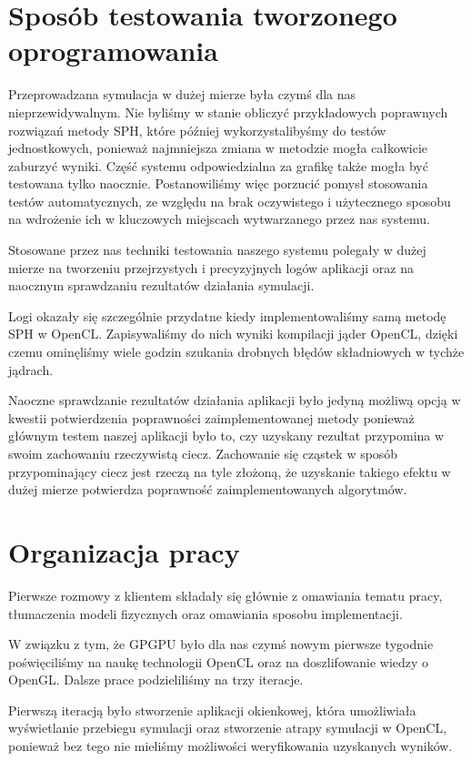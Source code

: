 \documentclass[polish, 12pt]{aghthesis}
\begin{document}
\section{Sposób testowania tworzonego oprogramowania}

	Przeprowadzana symulacja w dużej mierze była czymś dla nas nieprzewidywalnym. Nie byliśmy w stanie obliczyć przykładowych poprawnych rozwiązań metody SPH, które później wykorzystalibyśmy do testów jednostkowych, ponieważ najmniejsza zmiana w metodzie mogła całkowicie zaburzyć wyniki. Część systemu odpowiedzialna za grafikę także mogła być testowana tylko naocznie. Postanowiliśmy więc porzucić pomysł stosowania testów automatycznych, ze względu na brak oczywistego i użytecznego sposobu na wdrożenie ich w kluczowych miejscach wytwarzanego przez nas systemu.
	 
	 Stosowane przez nas techniki testowania naszego systemu polegały w dużej mierze na tworzeniu przejrzystych i precyzyjnych logów aplikacji oraz na naocznym sprawdzaniu rezultatów działania symulacji. 
	 
	 Logi okazały się szczególnie przydatne kiedy implementowaliśmy samą metodę SPH w OpenCL. Zapisywaliśmy do nich wyniki kompilacji jąder OpenCL, dzięki czemu ominęliśmy wiele godzin szukania drobnych błędów składniowych w tychże jądrach. 
	 
	 Naoczne sprawdzanie rezultatów działania aplikacji było jedyną możliwą opcją w kwestii potwierdzenia poprawności zaimplementowanej metody ponieważ głównym testem naszej aplikacji było to, czy uzyskany rezultat przypomina w swoim zachowaniu rzeczywistą ciecz. Zachowanie się cząstek w sposób przypominający ciecz jest rzeczą na tyle złożoną, że uzyskanie takiego efektu w dużej mierze potwierdza poprawność zaimplementowanych algorytmów. 
	 

\section{Organizacja pracy}

	Pierwsze rozmowy z klientem składały się głównie z omawiania tematu pracy, tłumaczenia modeli fizycznych oraz omawiania sposobu implementacji. 

	W związku z tym, że GPGPU było dla nas czymś nowym pierwsze tygodnie poświęciliśmy na naukę technologii OpenCL oraz na doszlifowanie wiedzy o OpenGL. Dalsze prace podzieliliśmy na trzy iteracje.

	Pierwszą iteracją było stworzenie aplikacji okienkowej, która umożliwiała wyświetlanie przebiegu symulacji oraz stworzenie atrapy symulacji w OpenCL, ponieważ bez tego nie mieliśmy możliwości weryfikowania uzyskanych wyników.
\end{document}
